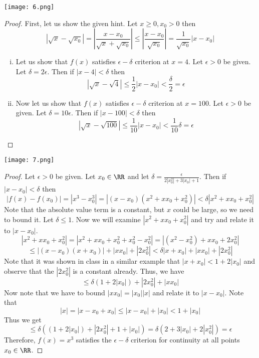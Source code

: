 \documentclass[12pt]{scrartcl}
\begin{document}
\texttt{[image: 6.png]}

\begin{proof}
  
\hfill

First, let us show the given hint. Let $x \geq 0, x_0 > 0$ then 
\[|\sqrt{x} - \sqrt{x_0}| = |\frac{x - x_0}{\sqrt{x} + \sqrt{x_0}}| \leq |\frac{x-x_0}{\sqrt{x_0}}| = \frac{1}{\sqrt{x_0}}|x - x_0|\]

\begin{enumerate}[i.]
  \item Let us show that $f(x)$ satisfies $\epsilon-\delta$ criterion at $x=4$. Let 
  $\epsilon > 0$ be given. Let $\delta = 2\epsilon$. Then if $|x - 4| < \delta$ then 
  \[|\sqrt{x} - \sqrt{4}| \leq \frac{1}{2}|x-x_0| < \frac{\delta}{2} = \epsilon\]
  \item Now let us show that $f(x)$ satisfies $\epsilon-\delta$ criterion at $x=100$. 
  Let $\epsilon > 0$ be given. Let $\delta = 10\epsilon$. Then if $|x-100| < \delta$ 
  then 
  \[|\sqrt{x} - \sqrt{100}| \leq \frac{1}{10}|x-x_0| < \frac{1}{10}\delta = \epsilon\]
\end{enumerate}

\end{proof}
\newpage 

\texttt{[image: 7.png]}


\begin{proof}
  Let $\epsilon > 0$ be given. Let $x_0 \in \RR$ and let $\delta = \frac{\epsilon}{2|x_0^2| + 3|x_0| + 1}$. Then if 
  $|x - x_0| < \delta$ then 
  \[|f(x) - f(x_0)| = |x^3 - x_0^3| = |(x-x_0) (x^2 + xx_0 + x_0^2)| < \delta |x^2 + xx_0 + x_0^2|\]
  Note that the absolute value term is a constant, but $x$ could be large, so we need to bound it.
  Let $\delta \leq 1$. Now we will examine $|x^2 + xx_0 + x_0^2|$ and try and relate it to $|x-x_0|$. 
  \[|x^2 + xx_0 + x_0^2| = |x^2 + xx_0 + x_0^2 + x_0^2 - x_0^2| = |(x^2 - x_0^2) + xx_0 + 2x_0^2|\]
  \[\leq |(x-x_0)(x + x_0)| + |xx_0| + |2x_0^2| < \delta |x + x_0| + |xx_0| + |2x_0^2|\]
  Note that it was shown in class in a similar example that $|x + x_0| < 1 + 2|x_0|$ and observe
  that the $|2x_0^2|$ is a constant already. Thus, we have 
  \[\leq \delta(1 + 2|x_0|) + |2x_0^2| + |xx_0|\]
  Now note that we have to bound $|xx_0| = |x_0||x|$ and relate it to $|x-x_0|$.
  Note that 
  \[|x| = |x - x_0 + x_0| \leq |x-x_0| + |x_0| < 1 + |x_0|\]
  Thus we get 
  \[\leq \delta ((1 + 2|x_0|) + |2x_0^2| + 1 + |x_0|) = \delta(2 + 3|x_0| + 2|x_0^2|) = \epsilon\]
  Therefore, $f(x) = x^3$ satisfies the $\epsilon-\delta$ criterion for continuity at all points 
  $x_0 \in \RR$. 
\end{proof}
\end{document}
